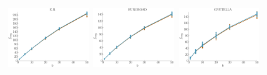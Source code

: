 \documentclass[a4paper]{report}
\newcommand{\wratio}{0.16}
\begin{document}
\includegraphics[width=\wratio\textwidth]{maxcut/E_R/fs_e_r}\hfill
\includegraphics[width=\wratio\textwidth]{maxcut/EUROROAD/fs_euroroad}\hfill
\includegraphics[width=\wratio\textwidth]{maxcut/GNUTELLA/fs_gnutella}\hfill
\end{document}
